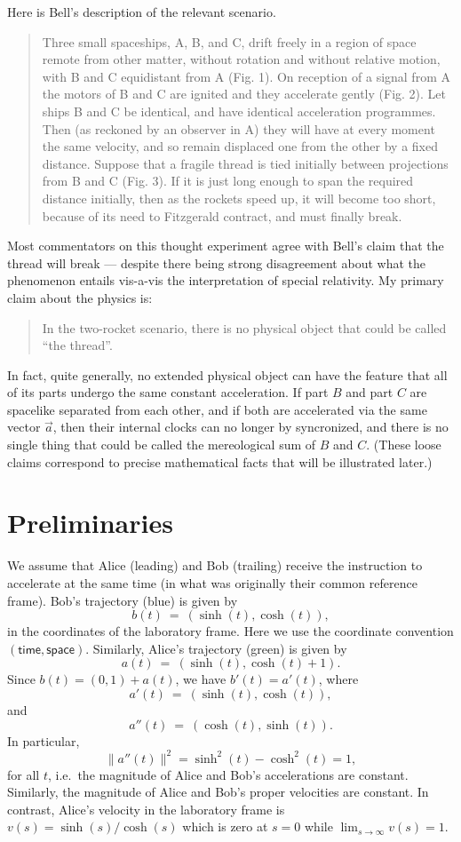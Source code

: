\documentclass[tikz,border=10pt,fleqn]{article}
\theoremstyle{definition}
\begin{document}
Here is Bell's description of the relevant scenario.
\begin{quote} Three small spaceships, A, B, and C, drift freely in a
  region of space remote from other matter, without rotation and
  without relative motion, with B and C equidistant from A (Fig. 1).
  On reception of a signal from A the motors of B and C are ignited
  and they accelerate gently (Fig. 2).  Let ships B and C be
  identical, and have identical acceleration programmes. Then (as
  reckoned by an observer in A) they will have at every moment the
  same velocity, and so remain displaced one from the other by a fixed
  distance. Suppose that a fragile thread is tied initially between
  projections from B and C (Fig. 3). If it is just long enough to span
  the required distance initially, then as the rockets speed up, it
  will become too short, because of its need to Fitzgerald contract,
  and must finally break. \end{quote} Most commentators on this
thought experiment agree with Bell's claim that the thread will break
--- despite there being strong disagreement about what the phenomenon
entails vis-a-vis the interpretation of special relativity. My primary
claim about the physics is:
\begin{quote} In the two-rocket scenario, there is no physical object
  that could be called ``the thread''. \end{quote} In fact, quite
generally, no extended physical object can have the feature that all
of its parts undergo the same constant acceleration. If part $B$ and
part $C$ are spacelike separated from each other, and if both are
accelerated via the same vector $\vec{a}$, then their internal clocks
can no longer by syncronized, and there is no single thing that could
be called the mereological sum of $B$ and $C$. (These loose claims
correspond to precise mathematical facts that will be illustrated
later.)

\section{Preliminaries}

We assume that Alice (leading) and Bob (trailing) receive the
instruction to accelerate at the same time (in what was originally
their common reference frame). Bob's trajectory (blue) is given by
\[ b(t) \: = \: (\sinh(t),\cosh(t) ) , \]
in the coordinates of the laboratory frame. Here we use the coordinate
convention $(\mathsf{time},\mathsf{space})$. Similarly, Alice's trajectory
(green) is given by
\[ a(t) \: = \: (\sinh (t),\cosh (t)+1) .\] Since $b(t)=(0,1)+a(t)$,
we have $b'(t)=a'(t)$, where \[ a'(t) \: = \: (\sinh (t),\cosh(t)) ,\]
and
\[ a''(t) \: = \: (\cosh (t),\sinh (t)) .\] In particular,
\[ \| a''(t) \|^2 = \sinh ^2 (t)-\cosh ^2(t) = 1 ,\] for all $t$,
i.e.\ the magnitude of Alice and Bob's accelerations are
constant. Similarly, the magnitude of Alice and Bob's proper
velocities are constant. In contrast, Alice's velocity in the
laboratory frame is $v(s)=\sinh (s)/\cosh (s)$ which is zero at $s=0$
while $\lim _{s\to\infty }v(s)=1$.
\end{document}
